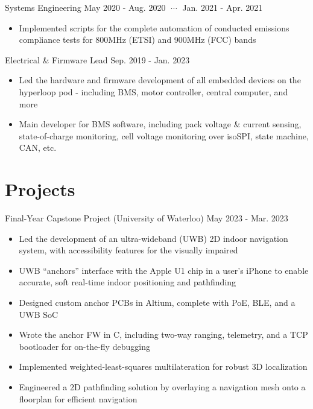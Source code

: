 \documentclass[lighthipster]{styles}
\begin{document}
\begin{paracol}{2}
{Systems Engineering}
{May 2020 - Aug. 2020 $\;\cdots\;$ Jan. 2021 - Apr. 2021}
\begin{itemize}
    \item Implemented scripts for the complete automation of conducted emissions
          compliance tests for 800MHz (ETSI) and 900MHz (FCC) bands
\end{itemize}

{Electrical \& Firmware Lead}
{Sep. 2019 - Jan. 2023}
\begin{itemize}
    \item Led the hardware and firmware development of all embedded devices on the hyperloop
          pod - including BMS, motor controller, central computer, and more
    \item Main developer for BMS software, including pack voltage \& current sensing,
          state-of-charge monitoring, cell voltage monitoring over isoSPI, state machine, CAN, etc.
\end{itemize}

\section*{Projects}

{Final-Year Capstone Project (University of Waterloo)}
{May 2023 - Mar. 2023}
\begin{itemize}
    \item Led the development of an ultra-wideband (UWB) 2D indoor navigation system,
          with accessibility features for the visually impaired
    \item UWB “anchors” interface with the Apple U1 chip in a user's iPhone to enable
          accurate, soft real-time indoor positioning and pathfinding
    \item Designed custom anchor PCBs in Altium, complete with PoE, BLE, and a UWB SoC
    \item Wrote the anchor FW in C, including two-way ranging, telemetry, and a TCP
          bootloader for on-the-fly debugging
    \item Implemented weighted-least-squares multilateration for robust 3D localization 
    \item Engineered a 2D pathfinding solution by overlaying a navigation mesh onto a
          floorplan for efficient navigation
\end{itemize}



\end{paracol}
\end{document}
